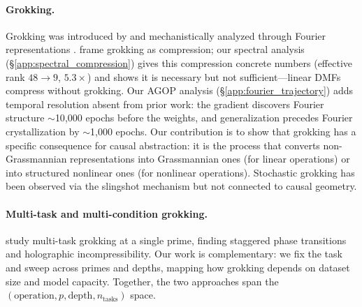 \documentclass{article}
\begin{document}
\paragraph{Grokking.}
Grokking was introduced by \citet{power2022grokking} and mechanistically
analyzed through Fourier representations \citep{nanda2023progress,
zhong2024clock}. \citet{liu2023grokking} frame grokking as compression;
our spectral analysis (\S\ref{app:spectral_compression}) gives this
compression concrete numbers (effective rank $48 \to 9$, $5.3\times$) and
shows it is necessary but not sufficient---linear DMFs compress without
grokking. Our AGOP analysis (\S\ref{app:fourier_trajectory}) adds temporal
resolution absent from prior work: the gradient discovers Fourier structure
$\sim$10{,}000 epochs before the weights, and generalization precedes
Fourier crystallization by $\sim$1{,}000 epochs. Our contribution is to
show that grokking has a specific consequence for causal abstraction: it is
the process that converts non-Grassmannian representations into Grassmannian
ones (for linear operations) or into structured nonlinear ones (for nonlinear
operations). Stochastic grokking has been observed via the slingshot mechanism
\citep{thilak2022slingshot} but not connected to causal geometry.

\paragraph{Multi-task and multi-condition grokking.}
\citet{xu2026multitask} study multi-task grokking at a single prime, finding
staggered phase transitions and holographic incompressibility. Our work is
complementary: we fix the task and sweep across primes and depths, mapping how
grokking depends on dataset size and model capacity. Together, the two
approaches span the $(\text{operation}, p, \text{depth}, n_\text{tasks})$
space.
\end{document}
